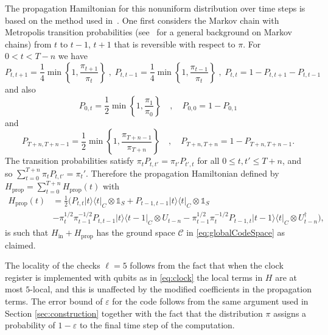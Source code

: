 \documentclass[11pt,letterpaper]{article}
\theoremstyle{definition}
\theoremstyle{remark}
\renewcommand{\leq}{\leqslant}
\numberwithin{equation}{section}
\theoremstyle{definition}
\newcommand{\ket}[1]{|#1\rangle}
\newcommand{\bra}[1]{\langle#1|}
\begin{document}
The propagation Hamiltonian for this nonuniform distribution over time steps is based on the method used in~\cite{Bausch2018analysislimitations}.  One first considers the Markov chain with Metropolis transition probabilities (see~\cite{levin2017markov} for a general background on Markov chains) from $t$ to $t-1$, $t+1$ that is reversible with respect to $\pi$.  For $0 < t < T - n$ we have
\begin{equation}
   P_{t,t+1} = \frac{1}{4} \min\left\{1,\frac{\pi_{t+1}}{\pi_t}\right \} \; , \;  P_{t,t-1}  = \frac{1}{4}\min\left\{1,\frac{\pi_{t-1}}{\pi_t}\right \} \; , \;  P_{t,t} = 1 -  P_{t,t+1} -  P_{t,t-1}\label{eq:MetropolisTransitionProbabilities}
\end{equation}
and also
\begin{equation}
P_{0,t} = \frac{1}{2}  \min\left\{1,\frac{\pi_{1}}{\pi_0}\right \} \quad , \quad P_{0,0} =1 - P_{0,1}
\end{equation}
and
\begin{equation}
P_{T + n, T + n -1} = \frac{1}{2}  \min\left\{1,\frac{\pi_{T + n -1 }}{\pi_{T + n}}\right \} \quad , \quad P_{T + n, T+n} =1 - P_{T+n,T + n - 1}.
\end{equation}
The transition probabilities satisfy $\pi_t P_{t,t'} = \pi_{t'} P_{t',t}$ for all $0 \leq t,t' \leq T + n$, and so $\sum_{t = 0}^{T + n} \pi_t P_{t,t'} = \pi_t'$.  Therefore the propagation Hamiltonian defined by $H_{\textrm{prop}} = \sum_{t = 0}^{T + n} H_{\textrm{prop}}(t)$ with
\begin{align}
H_{\textrm{prop}}(t) &= \frac{1}{2}\bigl( P_{t,t}\ket{t}\bra{t}_C\otimes \mathds{1}_S + P_{t-1,t-1}\ket{t}\bra{t}_C \otimes \mathds{1}_S \\ &-  \pi_t^{1/2} \pi_{t-1}^{-1/2} P_{t,t-1}\ket{t}\bra{t-1}_C\otimes U_{t - n} -  \pi_{t-1}^{1/2} \pi_{t}^{-1/2} P_{t-1,t}\ket{t-1}\bra{t}_C\otimes U_{t - n}^\dagger \bigr),
\end{align}
is such that $H_{\textrm{in}} + H_{\textrm{prop}}$ has the ground space $\mathcal{C}$ in \eqref{eq:globalCodeSpace} as claimed. 

The locality of the checks $\ell = 5$ follows from the fact that when the clock register is implemented with qubits as in \eqref{eq:clock} the local terms in $H$ are at most $5$-local, and this is unaffected by the modified coefficients in the propagation terms.  The error bound of $\varepsilon$ for the code follows from the same argument used in Section \ref{sec:construction} together with the fact that the distribution $\pi$ assigns a probability of $1 - \varepsilon$ to the final time step of the computation.  
\end{document}

